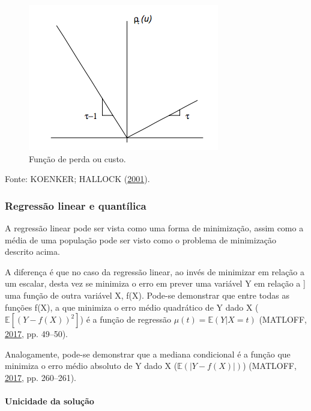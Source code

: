 \documentclass[a4paper, 12pt]{article}
\let\oldparagraph\paragraph
\renewcommand{\paragraph}[1]{\oldparagraph{#1}\mbox{}}
\newcommand{\bcenter}{\begin{center}}
\newcommand{\ecenter}{\end{center}}
\begin{document}
\begin{figure}[H]

{\centering \includegraphics[width=0.7\linewidth]{DmKq7} 

}

\caption{Função de perda ou custo.}\label{fig:unnamed-chunk-1}
\end{figure}

\bcenter Fonte: KOENKER; HALLOCK (\protect\hyperlink{ref-qr}{2001}).
\ecenter

\hypertarget{regressao-linear-e-quantilica}{%
\subsubsection{Regressão linear e
quantílica}\label{regressao-linear-e-quantilica}}

A regressão linear pode ser vista como uma forma de minimização, assim
como a média de uma população pode ser visto como o problema de
minimização descrito acima.

A diferença é que no caso da regressão linear, ao invés de minimizar em
relação a um escalar, desta vez se minimiza o erro em prever uma
variável Y em relação a {]} uma função de outra variável X, f(X).
Pode-se demonstrar que entre todas as funções f(X), a que minimiza o
erro médio quadrático de Y dado X (\(\mathbb{E}[(Y - f(X))^2]\)) é a
função de regressão \(\mu(t) = \mathbb{E}(Y|X=t)\) (MATLOFF,
\protect\hyperlink{ref-matloff2017}{2017}, pp. 49--50).

Analogamente, pode-se demonstrar que a mediana condicional é a função
que minimiza o erro médio absoluto de Y dado X
(\(\mathbb{E}(|Y-f(X)|)\)) (MATLOFF,
\protect\hyperlink{ref-matloff2017}{2017}, pp. 260--261).

\hypertarget{unicidade-da-solucao}{%
\paragraph{Unicidade da solução}\label{unicidade-da-solucao}}
\end{document}
